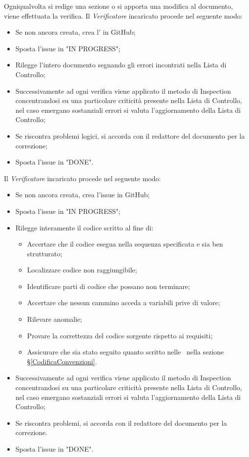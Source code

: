 \label{VerificaDocumentazione}
Ogniqualvolta si redige una sezione o si apporta una modifica al documento, viene effettuata la verifica.
Il \textit{Verificatore} incaricato procede nel seguente modo:
\begin{itemize}
	\item Se non ancora creata, crea l' in GitHub;
	\item Sposta l'issue in "IN PROGRESS";
	\item Rilegge l'intero documento segnando gli errori incontrati nella Lista di Controllo;
	\item Successivamente ad ogni verifica viene applicato il metodo di Inspection concentrandosi su una particolare criticità presente nella Lista di Controllo, nel caso emergano sostanziali errori si valuta l'aggiornamento della Lista di Controllo;
	\item Se riscontra problemi logici, si accorda con il redattore del documento per la correzione;
	\item Sposta l'issue in "DONE".
\end{itemize}

\label{VerificaCodice}Il \textit{Verificatore} incaricato procede nel seguente modo:
\begin{itemize}
	\item Se non ancora creata, crea l'issue in GitHub;
	\item Sposta l'issue in "IN PROGRESS";
	\item Rilegge interamente il codice scritto al fine di:
	\begin{itemize}
		\item Accertare che il codice esegua nella sequenza specificata e sia ben strutturato;
		\item Localizzare codice non raggiungibile;
		\item Identificare parti di codice che possano non terminare;
		\item Accertare che nessun cammino acceda a variabili prive di valore;
		\item Rilevare anomalie;
		\item Provare la correttezza del codice sorgente rispetto ai requisiti;
		\item Assicurare che sia stato seguito quanto scritto nelle \NdPv\ nella sezione \S\ref{CodificaConvenzioni}.
	\end{itemize}
	\item Successivamente ad ogni verifica viene applicato il metodo di Inspection concentrandosi su una particolare criticità presente nella Lista di Controllo, nel caso emergano sostanziali errori si valuta l'aggiornamento della Lista di Controllo;
	\item Se riscontra problemi, si accorda con il redattore del documento per la correzione. 
	\item Sposta l'issue in "DONE".
\end{itemize}


